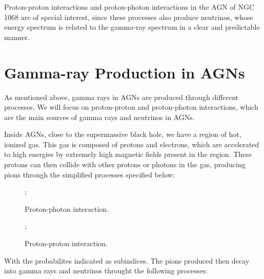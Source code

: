 Proton-proton interactions and proton-photon interactions in the AGN of NGC 1068 are of special interest, since these processes also produce neutrinos, whose energy spectrum is related to the gamma-ray spectrum in a clear and predictable manner.


\section{Gamma-ray Production in AGNs}

As mentioned above, gamma rays in AGNs are produced through different processes. We will focus on proton-proton and proton-photon interactions, which are the main sources of gamma rays and neutrinos in AGNs.

Inside AGNs, close to the supermassive black hole, we have a region of hot, ionized gas. This gas is composed of protons and electrons, which are accelerated to high energies by extremely high magnetic fields present in the region. These protons can then collide with other protons or photons in the gas, producing pions through the simplified processes specified below:


\begin{figure}[H]
    \centering
    ;
    \caption{Proton-photon interaction.}
  \end{figure}

\begin{figure}[H]
  \centering
  ;
  \caption{Proton-proton interaction.}

\end{figure}

With the probabilites indicated as subindices. The pions produced then decay into gamma rays and neutrinos throught the following processes:

